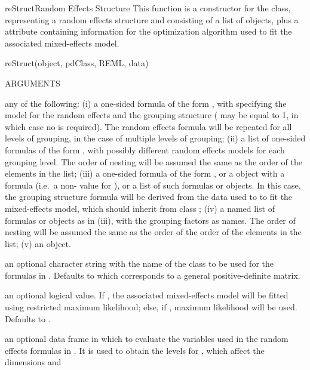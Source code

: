 \documentclass[pdftex]{article} \usepackage{url,graphicx}
\renewcommand{\Twiddle}{\mbox{\(\sim\)}}
\begin{document}
\begin{Helpfile}{reStruct}{Random Effects Structure}
This function is a constructor for the  class,
representing a random effects structure and consisting of a list of
 objects, plus a  attribute containing
information for the optimization algorithm used to fit the associated
mixed-effects model.
\begin{Example}
reStruct(object, pdClass, REML, data)
\end{Example}
\begin{Argument}{ARGUMENTS}
\item[\Co{object:}]
any of the following: (i) a one-sided formula of the form
\Co{\Twiddle x1+...+xn | g1/.../gm}, with  specifying the
model for the random effects and  the grouping
structure ( may be equal to 1, in which case no \Co{/} is
required). The random effects formula will be repeated for all levels
of grouping, in the case of multiple levels of grouping; (ii) a list of
one-sided formulas of the form \Co{\Twiddle x1+...+xn | g}, with possibly
different random effects models for each grouping level. The order of
nesting will be assumed the same as the order of the elements in the
list; (iii) a one-sided formula of the form \Co{\Twiddle x1+...+xn}, or a
 object with a formula (i.e.\ a non- value for
), or a list of such formulas or 
objects. In this case, the grouping structure formula will be derived
from the data used to to fit the mixed-effects model, which should
inherit from class ; (iv) a named list of formulas or
 objects as in (iii), with the grouping factors as
names. The order of nesting will be assumed the same as the order of
the order of the elements in the list; (v) an  object.
\item[\Co{pdClass:}]
an optional character string with the name of the
 class to be used for the formulas in
. Defaults to  which corresponds to a
general positive-definite matrix.
\item[\Co{REML:}]
an optional logical value. If , the associated
mixed-effects model will be fitted using restricted maximum
likelihood; else, if , maximum likelihood will be
used. Defaults to .
\item[\Co{data:}]
an optional data frame in which to evaluate the variables
used in the random effects formulas in . It is used to
obtain the levels for , which affect the dimensions and

\end{Argument}
\end{Helpfile}
\end{document}
